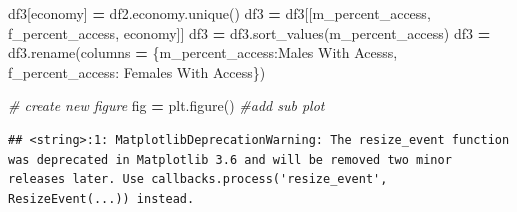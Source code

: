 \documentclass[water,article,submit,moreauthors,pdftex]{mdpi}
\newenvironment{Shaded}{\begin{snugshade}}{\end{snugshade}}
\newcommand{\CommentTok}[1]{\textcolor[rgb]{0.56,0.35,0.01}{\textit{#1}}}
\newcommand{\NormalTok}[1]{#1}
\newcommand{\OperatorTok}[1]{\textcolor[rgb]{0.81,0.36,0.00}{\textbf{#1}}}
\newcommand{\StringTok}[1]{\textcolor[rgb]{0.31,0.60,0.02}{#1}}
\begin{document}
\begin{Shaded}
\begin{Highlighting}[]
\NormalTok{df3[}\StringTok{\textquotesingle{}economy\textquotesingle{}}\NormalTok{] }\OperatorTok{=}\NormalTok{ df2.economy.unique()}
\NormalTok{df3 }\OperatorTok{=}\NormalTok{ df3[[}\StringTok{\textquotesingle{}m\_percent\_access\textquotesingle{}}\NormalTok{, }\StringTok{\textquotesingle{}f\_percent\_access\textquotesingle{}}\NormalTok{,   }\StringTok{\textquotesingle{}economy\textquotesingle{}}\NormalTok{]]}
\NormalTok{df3 }\OperatorTok{=}\NormalTok{ df3.sort\_values(}\StringTok{\textquotesingle{}m\_percent\_access\textquotesingle{}}\NormalTok{)}
\NormalTok{df3 }\OperatorTok{=}\NormalTok{ df3.rename(columns }\OperatorTok{=}\NormalTok{ \{}\StringTok{\textquotesingle{}m\_percent\_access\textquotesingle{}}\NormalTok{:}\StringTok{\textquotesingle{}Males With Acesss\textquotesingle{}}\NormalTok{, }\StringTok{\textquotesingle{}f\_percent\_access\textquotesingle{}}\NormalTok{: }\StringTok{\textquotesingle{}Females With Access\textquotesingle{}}\NormalTok{\})}
\end{Highlighting}
\end{Shaded}

\begin{Shaded}
\begin{Highlighting}[]
\CommentTok{\# create new figure}
\NormalTok{fig }\OperatorTok{=}\NormalTok{ plt.figure()}
\CommentTok{\#add sub plot}
\end{Highlighting}
\end{Shaded}

\begin{verbatim}
## <string>:1: MatplotlibDeprecationWarning: The resize_event function was deprecated in Matplotlib 3.6 and will be removed two minor releases later. Use callbacks.process('resize_event', ResizeEvent(...)) instead.
\end{verbatim}
\end{document}
